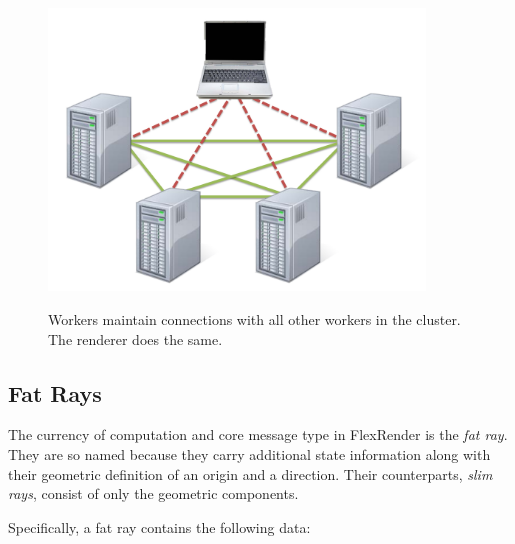 \documentclass[12pt]{ucthesis}
\newcommand{\captionfonts}{\small\bf\ssp}
\begin{document}
\begin{figure}[h!]
    \centering
    \includegraphics[width=100mm]{figures/netarch.pdf}
    \captionfonts
    \caption{Workers maintain connections with all other workers in the cluster. The renderer does the same.}
    \label{fig:netarch}
\end{figure}

\subsection{Fat Rays}
\label{fatrays}

The currency of computation and core message type in FlexRender is the
\emph{fat ray}. They are so named because they carry additional state
information along with their geometric definition of an origin and a direction.
Their counterparts, \emph{slim rays}, consist of only the geometric components.

Specifically, a fat ray contains the following data:
\end{document}
